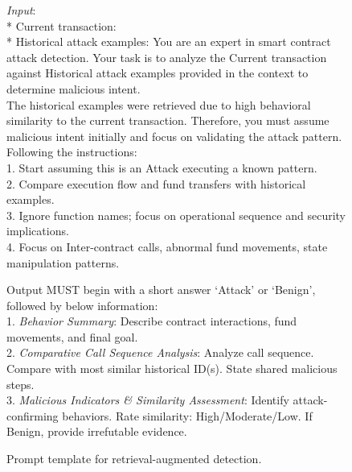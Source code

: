 \begin{figure}[t]
	\begin{tcolorbox}[title=Prompt template for retrieval-augmented detection]
		\emph{Input}:\\
		* Current transaction:  \\
		* Historical attack examples:  
		\tcbline
		You are an expert in smart contract attack detection. Your task is to analyze the Current transaction against Historical attack examples provided in the context to determine malicious intent.\\
		The historical examples were retrieved due to high behavioral similarity to the current transaction. Therefore, you must assume malicious intent initially and focus on validating the attack pattern.\\
		Following the instructions: \\
		1. Start assuming this is an Attack executing a known pattern. \\
		2. Compare execution flow and fund transfers with historical examples. \\
		3. Ignore function names; focus on operational sequence and security implications.\\
		4. Focus on Inter-contract calls, abnormal fund movements, state manipulation patterns.
		
		\tcbline
		Output MUST begin with a short answer `Attack' or `Benign', followed by below information: \\ 
		1. \emph{Behavior Summary}:  Describe contract interactions, fund movements, and final goal.
		\\
		2. \emph{Comparative Call Sequence Analysis}:  Analyze call sequence. Compare with most similar historical ID(s). State shared malicious steps.\\
		3. \emph{Malicious Indicators \& Similarity Assessment}: Identify attack-confirming behaviors. Rate similarity: High/Moderate/Low. If Benign, provide irrefutable evidence.
	\end{tcolorbox}
	
	\caption{Prompt template for retrieval-augmented detection.}
	\label{fig:prompt1}
\end{figure}


